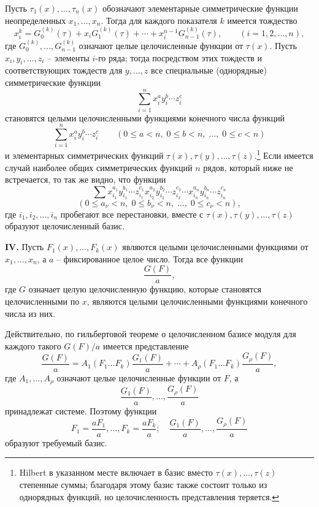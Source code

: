 \documentclass[11pt]{article}
\begin{document}
Пусть \(\tau_1(x),\ldots,\tau_n(x)\) обозначают элементарные симметрические функции неопределенных \(x_1,\ldots,x_n\). Тогда для каждого показателя \(k\) имеется тождество
\[
        x_i^k = G_0^{(k)}(\tau)+x_iG_1^{(k)}(\tau)+\cdots+x_i^{n-1}G_{n-1}^{(k)}(\tau),
        \qquad (i=1,2,\ldots,n),
\]
где \(G_0^{(k)},\ldots,G_{n-1}^{(k)}\) означают целые целочисленные функции от \(\tau(x)\). Пусть \(x_i,y_i,\ldots,z_i\) -- элементы \(i\)-го ряда; тогда посредством этих тождеств и соответствующих тождеств для \(y,\ldots,z\) все специальные (однорядные) симметрические функции
\[
        \sum_{i=1}^n x_i^{a}y_i^{b}\cdots z_i^{c}
\]
становятся целыми целочисленными функциями конечного числа функций
\[
        \sum_{i=1}^n x_i^{a}y_i^{b}\cdots z_i^{c}
        \qquad
        (0\le a<n,\;0\le b<n,\;\ldots,\;0\le c<n)
\]
и элементарных симметрических функций \(\tau(x),\tau(y),\ldots,\tau(z)\).\footnote{Hilbert в указанном месте включает в базис вместо \(\tau(x),\ldots,\tau(z)\) степенные суммы; благодаря этому базис также состоит только из однорядных функций, но целочисленность представления теряется.}
Если имеется случай наиболее общих симметрических функций \(n\) рядов, который ниже не встречается, то так же видно, что функции
\[
        \sum x_{i_1}^{a_1}y_{i_1}^{b_1}\cdots z_{i_1}^{c_1}
              x_{i_2}^{a_2}y_{i_2}^{b_2}\cdots z_{i_2}^{c_2}
              \cdots
              x_{i_n}^{a_n}y_{i_n}^{b_n}\cdots z_{i_n}^{c_n}
\]
\[
        (0\le a_\nu<n,\;0\le b_\nu<n,\;\ldots,\;0\le c_\nu<n),
\]
где \(i_1,i_2,\ldots,i_n\) пробегают все перестановки, вместе с \(\tau(x),\tau(y),\ldots,\tau(z)\) образуют целочисленный базис.

\textbf{IV.} Пусть \(F_1(x),\ldots,F_k(x)\) являются целыми целочисленными функциями от \(x_1,\ldots,x_n\), а \(a\) -- фиксированное целое число. Тогда все функции
\[
        \frac{G(F)}{a},
\]
где \(G\) означает целую целочисленную функцию, которые становятся целочисленными по \(x\), являются целыми целочисленными функциями конечного числа из них.

Действительно, по гильбертовой теореме о целочисленном базисе модуля для каждого такого \(G(F)/a\) имеется представление
\[
 \frac{G(F)}{a}
 =
 A_1(F_1\ldots F_k)\frac{G_1(F)}{a}
 +\cdots+
 A_\rho(F_1\ldots F_k)\frac{G_\rho(F)}{a},
\]
где \(A_1,\ldots,A_\rho\) означают целые целочисленные функции от \(F\), а
\[
        \frac{G_1(F)}{a},\ldots,\frac{G_\rho(F)}{a}
\]
принадлежат системе. Поэтому функции
\[
        F_1=\frac{aF_1}{a},\ldots,F_k=\frac{aF_k}{a};
        \quad
        \frac{G_1(F)}{a},\ldots,\frac{G_\rho(F)}{a}
\]
образуют требуемый базис.
\end{document}
